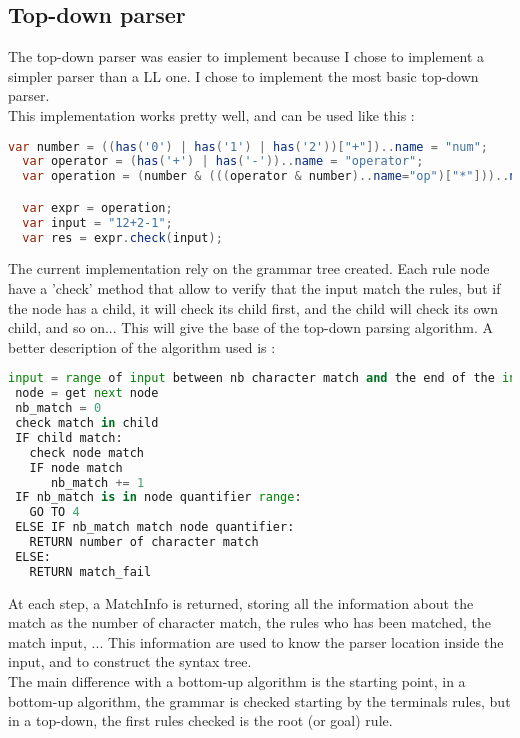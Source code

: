 \subsection{Top-down parser}
The top-down parser was easier to implement because I chose to implement a simpler parser than a LL one. I chose to implement the most basic top-down parser.\\
This implementation works pretty well, and can be used like this :
\begin{lstlisting}[language=java, caption=top-down parser example]
  var number = ((has('0') | has('1') | has('2'))["+"])..name = "num";
  var operator = (has('+') | has('-'))..name = "operator";
  var operation = (number & (((operator & number)..name="op")["*"]))..name = "operation";

  var expr = operation;
  var input = "12+2-1";
  var res = expr.check(input);
\end{lstlisting}

The current implementation rely on the grammar tree created. Each rule node have a 'check' method that allow to verify that the input match the rules, but if the node has a child, it will check its child first, and the child will check its own child, and so on... This will give the base of the top-down parsing algorithm. A better description of the algorithm used is :
\begin{lstlisting}[language=python, caption=top-down pseudo code algorithm]
 input = range of input between nb character match and the end of the input
 node = get next node
 nb_match = 0
 check match in child
 IF child match:
   check node match
   IF node match
      nb_match += 1
 IF nb_match is in node quantifier range:
   GO TO 4
 ELSE IF nb_match match node quantifier:
   RETURN number of character match
 ELSE:
   RETURN match_fail
\end{lstlisting}
 At each step, a MatchInfo is returned, storing all the information about the match as the number of character match, the rules who has been matched, the match input, ... This information are used to know the parser location inside the input, and to construct the syntax tree.\\
The main difference with a bottom-up algorithm is the starting point, in a bottom-up algorithm, the grammar is checked starting by the terminals rules, but in a top-down, the first rules checked is the root (or goal) rule.
 
